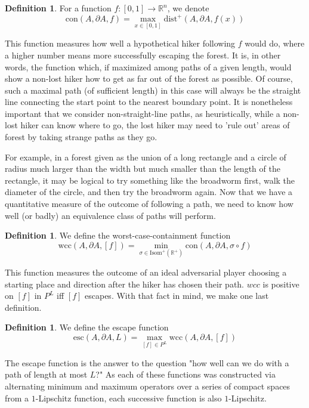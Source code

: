\documentclass[10pt,a4paper]{article}
\theoremstyle{definition}
\newtheorem{dfn}[thm]{Definition}
\def\R{\mathbb{R}}
\begin{document}
\begin{dfn}For a function $f:[0,1]\rightarrow \R^n$, we denote 
$$\mathrm{con}(A,\partial A, f) = \max_{x\in[0,1]}\mathrm{dist}^+(A,\partial A, f(x))$$
\end{dfn}
\label{dfn:con}
This function measures how well a hypothetical hiker following $f$ would do, where a higher number means more successfully escaping the forest. It is, in other words, the function which, if maximized among paths of a given length, would show a non-lost hiker how to get as far out of the forest as possible. Of course, such a maximal path (of sufficient length) in this case will always be the straight line connecting the start point to the nearest boundary point. It is nonetheless important that we consider non-straight-line paths, as heuristically, while a non-lost hiker can know where to go, the lost hiker may need to 'rule out' areas of forest by taking strange paths as they go. 

For example, in a forest given as the union of a long rectangle and a circle of radius much larger than the width but much smaller than the length of the rectangle, it may be logical to try something like the broadworm first, walk the diameter of the circle, and then try the broadworm again.  Now that we have a quantitative measure of the outcome of following a path, we need to know how well (or badly) an equivalence class of paths will perform. 

\begin{dfn} We define the worst-case-containment function
$$\mathrm{wcc}(A,\partial A, [f]) = \min_{\sigma\in \mathrm{Isom}^+(\R^+)} \mathrm{con}(A,\partial A, \sigma\circ f)$$
\end{dfn}
\label{dfn:wcc}
This function measures the outcome of an ideal adversarial player choosing a starting place and direction after the hiker has chosen their path. $wcc$ is positive on $[f]$ in $P^L$ iff $[f]$ escapes. With that fact in mind, we make one last definition.

\begin{dfn} We define the escape function
$$\mathrm{esc}(A,\partial A ,L) = \max_{[f]\in P^L}\mathrm{wcc}(A,\partial A, [f])$$
\end{dfn}
\label{dfn:esc}
The escape function is the answer to the question "how well can we do with a path of length at most $L$?" As each of these functions was constructed via alternating minimum and maximum operators over a series of compact spaces from a $1$-Lipschitz function, each successive function is also $1$-Lipschitz.
\end{document}

